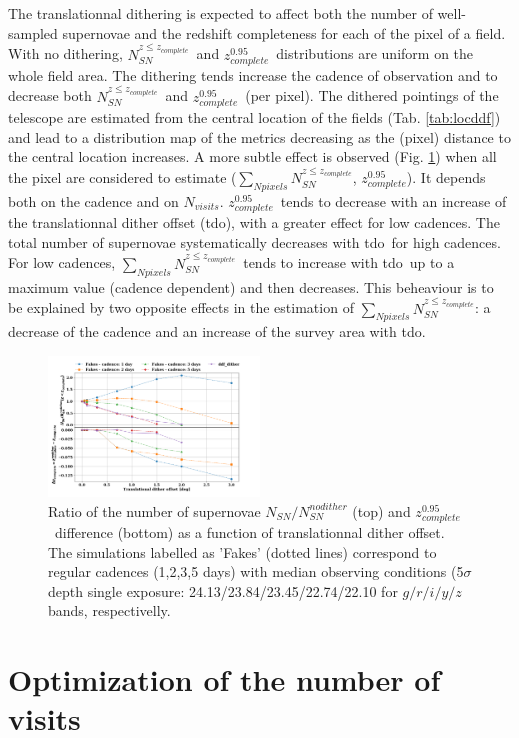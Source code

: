 \documentclass[skiphelvet,twocolumn]{aastex63}
\newcommand{\nsncomp}{{$N_{SN}^{z\leq z_{complete}}$}}
\newcommand{\sumnsncomp}{{$\sum\limits_{Npixels} N_{SN}^{z\leq z_{complete}}$}}
\newcommand{\zcompb}{\mbox{$z_{complete}^{0.95}$}}
\newcommand{\nvisits}{$N_{visits}$}
\newcommand{\doffset}{tdo}
\begin{document}
\par
The translationnal dithering is expected to affect both the number of well-sampled supernovae and the redshift completeness for each of the pixel of a field. With no dithering, \nsncomp~and \zcompb~distributions are uniform on the whole field area. The dithering tends increase the cadence of observation and to decrease both \nsncomp~and \zcompb~(per pixel). The dithered pointings of the telescope are estimated from the central location of the fields (Tab. \ref{tab:locddf}) and lead to a distribution map of the metrics decreasing as the (pixel) distance to the central location increases. A more subtle effect is observed (Fig. \ref{fig:dither}) when all the pixel are considered to estimate (\sumnsncomp, \zcompb). It depends both on the cadence and on \nvisits. \zcompb~tends to decrease with an increase of the translationnal dither offset (\doffset), with a greater effect for low cadences. The total number of supernovae systematically decreases with \doffset~for high cadences. For low cadences, \sumnsncomp~tends to increase with \doffset~up to a maximum value (cadence dependent) and then decreases. This beheaviour is to be explained by two opposite effects in the estimation of \sumnsncomp: a decrease of the cadence and an increase of the survey area with \doffset.

\begin{figure}[htbp]
  \begin{center}
  \includegraphics[width=0.5\textwidth]{dither_ddf.png}
 \caption{Ratio of the number of supernovae $N_{SN}/N_{SN}^{nodither}$ (top) and \zcompb~difference (bottom) as a function of translationnal dither offset. The simulations labelled as 'Fakes' (dotted lines) correspond to regular cadences (1,2,3,5 days) with median observing conditions (5$\sigma$ depth single exposure: 24.13/23.84/23.45/22.74/22.10 for $g/r/i/y/z$ bands, respectivelly.}\label{fig:dither}
\end{center}
\end{figure}



\section{Optimization of the number of visits}
\label{sec:opti}
\end{document}
